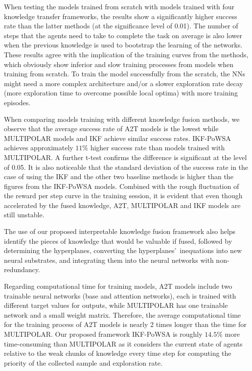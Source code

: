 \documentclass[lettersize,journal]{IEEEtran}
\begin{document}
When testing the models trained from scratch with models trained with four knowledge transfer frameworks, the results show a significantly higher success rate than the latter methods (at the significance level of 0.01). The number of steps that the agents need to take to complete the task on average is also lower when the previous knowledge is used to bootstrap the learning of the networks. These results agree with the implication of the training curves from the methods, which obviously show inferior and slow training processes from models when training from scratch. To train the model successfully from the scratch, the NNs might need a more complex architecture and/or a slower exploration rate decay (more exploration time to overcome possible local optima) with more training episodes. 

When comparing models training with different knowledge fusion methods, we observe that the average success rate of A2T models is the lowest while MULTIPOLAR models and IKF achieve similar success rates. IKF-PoWSA achieves approximately $11\%$ higher success rate than models trained with MULTIPOLAR. A further t-test confirms the difference is significant at the level of 0.05. It is also noticeable that the standard deviation of the success rate in the case of using the IKF and the other two baseline methods is higher than the figures from the IKF-PoWSA models. Combined with the rough fluctuation of the reward per step curve in the training session, it is evident that even though accelerated by the fused knowledge, A2T, MULTIPOLAR and IKF models are still unstable.

The use of our proposed interpretable knowledge fusion framework also helps identify the pieces of knowledge that would be valuable if fused, followed by determining the hyperplanes, converting the hyperplanes\textquoteright \ inequations into new neural substrates, and integrating them into the neural networks with non-redundancy.

Regarding computational time for training models, A2T models include two trainable neural networks (base and attention networks), each is trained with different target values for outputs, while MULTIPOLAR has one trainable network and a small weight matrix. Therefore, the average computational time for the training process of A2T models is nearly 2 times longer than the time for MULTIPOLAR. Our proposed framework IKF-PoWSA is roughly $14.5\%$ more time-consuming than MULTIPOLAR as it considers the current state of agents relative to the weak chunks of knowledge every time step for computing the priority of the collected sample and exploration rate.
\end{document}
